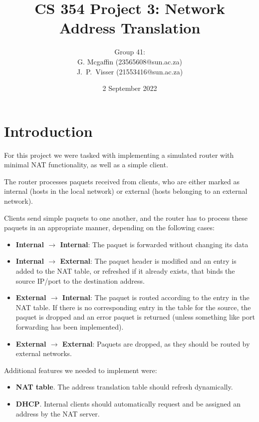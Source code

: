 \documentclass[10pt, a4paper]{article}
\title{CS 354 Project 3: Network Address Translation}
\author{Group 41: \vspace{0.5em} \\
        G. Mcgaffin (23565608@sun.ac.za) \vspace{0.3em} \\
        J.\ P.\ Visser (21553416@sun.ac.za)}
\date{\vspace{1em} 2 September 2022}
\begin{document}

\maketitle
\newpage


\tableofcontents
\newpage


\section{Introduction}
\label{sec:intro}

For this project we were tasked with implementing a simulated router with
minimal NAT functionality, as well as a simple client.

The router processes paquets received from clients, who are either marked as
internal (hosts in the local network) or external (hosts belonging to an
external network).

Clients send simple paquets to one another, and the router has to process these
paquets in an appropriate manner, depending on the following cases:
\begin{itemize}
  \item \textbf{Internal $\rightarrow$ Internal}: The paquet is forwarded
  without changing its data
  \item \textbf{Internal $\rightarrow$ External}: The paquet header is modified
  and an entry is added to the NAT table, or refreshed if it already exists,
  that binds the source IP/port to the destination address.
  \item \textbf{External $\rightarrow$ Internal}: The paquet is routed according
  to the entry in the NAT table. If there is no corresponding entry in the table
  for the source, the paquet is dropped and an error paquet is returned (unless
  something like port forwarding has been implemented).
  \item \textbf{External $\rightarrow$ External}: Paquets are dropped, as they
  should be routed by external networks.
\end{itemize}

Additional features we needed to implement were:

\begin{itemize}
  \item \textbf{NAT table}. The address translation table should refresh
    dynamically.
  \item \textbf{DHCP}. Internal clients should automatically request and be
    assigned an address by the NAT server.
\end{itemize}
\end{document}
